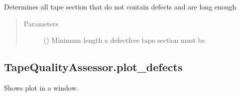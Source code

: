 \documentclass[letterpaper,10pt,english]{sphinxmanual}
\begin{document}
\begin{fulllineitems}
\begin{fulllineitems}
\label{\detokenize{generated/quality_assessment.quality_assessor.TapeQualityAssessor.determine_ok_tape_section:quality_assessment.quality_assessor.TapeQualityAssessor.determine_ok_tape_section}}
\sphinxAtStartPar
Determines all tape section that do not contain defects and are long enough
\begin{quote}\begin{description}
\item[{Parameters}] \leavevmode
\sphinxAtStartPar
{} () \textendash{} Minimum length a defect\sphinxhyphen{}free tape section must be

\end{description}\end{quote}

\end{fulllineitems}



\subsection{TapeQualityAssessor.plot\_defects}
\label{\detokenize{generated/quality_assessment.quality_assessor.TapeQualityAssessor.plot_defects:tapequalityassessor-plot-defects}}\label{\detokenize{generated/quality_assessment.quality_assessor.TapeQualityAssessor.plot_defects::doc}}

\begin{fulllineitems}
\label{\detokenize{generated/quality_assessment.quality_assessor.TapeQualityAssessor.plot_defects:quality_assessment.quality_assessor.TapeQualityAssessor.plot_defects}}
\sphinxAtStartPar
Shows plot in a window.

\end{fulllineitems}




\end{fulllineitems}
\end{document}

